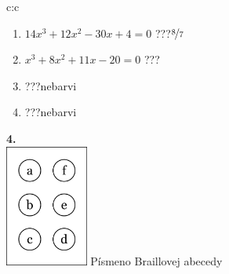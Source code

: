 \documentclass[10pt]{report}
\begin{document}
\begin{tabular}{c:c}
\begin{minipage}[c][99mm][t]{0.49\linewidth}
\begin{center}
\begin{minipage}{0.77\linewidth}
\begin{center}
\begin{varwidth}{\textwidth}
\begin{enumerate}
\item $14x^3+12x^2-30x+4=0$\quad \dotfill\; ???\;\dotfill \quad $\nicefrac{8}{7}$
\item $x^3+8x^2+11x-20=0$\quad \dotfill\; ???\;\dotfill {}
\item \quad \dotfill\; ???\;\dotfill \quad nebarvi
\item \quad \dotfill\; ???\;\dotfill \quad nebarvi
\end{enumerate}
\end{varwidth}
\end{center}
\end{minipage}
\begin{minipage}{0.20\linewidth}
\begin{center}
{\Huge\bfseries 4.} \\[2mm]
\includegraphics[height=40mm]{../images/braille.png}
{\small Písmeno Braillovej abecedy}
\end{center}
\end{minipage}
\end{center}
\end{minipage}

\end{tabular}
\clearpage
\end{document}
